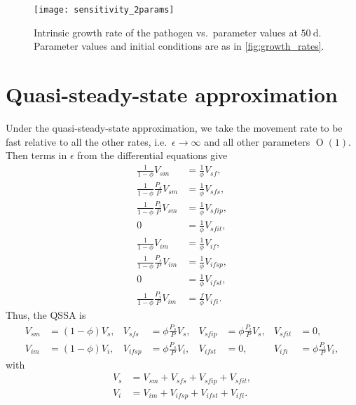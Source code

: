 \documentclass{article}
\begin{document}
\begin{figure}
  \centering
  \texttt{[image: sensitivity\_2params]}
  \caption{Intrinsic growth rate of the pathogen vs.~parameter values
    at $50~\text{d}$.  Parameter values and initial conditions are as
    in \autoref{fig:growth_rates}.}
  \label{fig:sensitivity_2params}
\end{figure}


\clearpage
\appendix
\section{Quasi-steady-state approximation}
\label{sec:QSSA}

Under the quasi-steady-state approximation, we take the movement rate
to be fast relative to all the other rates, i.e.~$\epsilon \to \infty$
and all other parameters $\operatorname{O}(1)$.  Then terms in
$\epsilon$ from the differential equations give
\begin{equation}
  \begin{split}
    \frac{1}{1 - \phi} V_{sm} &=
    \frac{1}{\phi} V_{sf},
    \\
    \frac{1}{1 - \phi} \frac{P_s}{P} V_{sm} &=
    \frac{1}{\phi} V_{sfs},
    \\
    \frac{1}{1 - \phi} \frac{P_i}{P} V_{sm} &=
    \frac{1}{\phi} V_{sfip},
    \\
    0 &=
    \frac{1}{\phi} V_{sfit},
    \\
    \frac{1}{1 - \phi} V_{im} &=
    \frac{1}{\phi} V_{if},
    \\
    \frac{1}{1 - \phi} \frac{P_s}{P} V_{im} &= \frac{1}{\phi} V_{ifsp},
    \\
    0 &= \frac{1}{\phi} V_{ifst},
    \\
    \frac{1}{1 - \phi} \frac{P_i}{P} V_{im} &= \frac{f}{\phi} V_{ifi}.
  \end{split}
\end{equation}
Thus, the QSSA is
\begin{equation}
  \begin{aligned}
    V_{sm} &= (1 - \phi) V_s,
    &
    V_{sfs} &= \phi \frac{P_s}{P} V_s,
    &
    V_{sfip} &= \phi \frac{P_i}{P} V_s,
    &
    V_{sfit} &= 0,
    \\
    V_{im} &= (1 - \phi) V_i,
    &
    V_{ifsp} &= \phi \frac{P_s}{P} V_i,
    &
    V_{ifst} &= 0,
    &
    V_{ifi} &= \phi \frac{P_i}{P} V_i,
  \end{aligned}
\end{equation}
with
\begin{equation}
  \begin{split}
    V_s &= V_{sm} + V_{sfs} + V_{sfip} + V_{sfit}, \\
    V_i &= V_{im} + V_{ifsp} + V_{ifst} + V_{ifi}.
  \end{split}
\end{equation}
\end{document}
